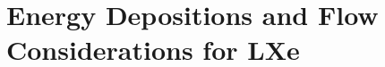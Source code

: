\documentclass[
reprint,
nofootinbib,
amsmath, amssymb,
aps,
floatfix,
]{revtex4-2}
\begin{document}



\section{Energy Depositions and Flow Considerations for LXe}
\end{document}
